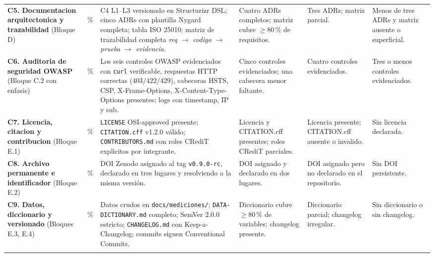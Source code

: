 \documentclass[11pt,a4paper]{article}
\begin{document}
{\begin{longtable}{|L{3.0cm}|C{0.9cm}|L{2.5cm}|L{2.5cm}|L{2.5cm}|L{2.3cm}|}
\textbf{C5. Documentacion arquitectonica y trazabilidad} (Bloque D) &
\,\% &
C4 L1--L3 versionado en Structurizr DSL; cinco ADRs con plantilla Nygard completa; tabla ISO 25010; matriz de trazabilidad completa \emph{req $\rightarrow$ codigo $\rightarrow$ prueba $\rightarrow$ evidencia}. &
Cuatro ADRs completos; matriz cubre $\geq 80$\,\% de requisitos. &
Tres ADRs; matriz parcial. &
Menos de tres ADRs y matriz ausente o superficial. \\

\textbf{C6. Auditoria de seguridad OWASP} (Bloque C.2 con enfasis) &
\,\% &
Los seis controles OWASP evidenciados con \texttt{curl} verificable, respuestas HTTP correctas (403/422/429), cabeceras HSTS, CSP, X-Frame-Options, X-Content-Type-Options presentes; logs con timestamp, IP y sub. &
Cinco controles evidenciados; una cabecera menor faltante. &
Cuatro controles evidenciados. &
Tres o menos controles evidenciados. \\

\textbf{C7. Licencia, citacion y contribucion} (Bloque E.1) &
\,\% &
\texttt{LICENSE} OSI-approved presente; \texttt{CITATION.cff} v1.2.0 v\'{a}lido; \texttt{CONTRIBUTORS.md} con roles CRediT explicitos por integrante. &
Licencia y CITATION.cff presentes; roles CRediT parciales. &
Licencia presente; CITATION.cff ausente o invalido. &
Sin licencia declarada. \\

\textbf{C8. Archivo permanente e identificador} (Bloque E.2) &
\,\% &
DOI Zenodo asignado al tag \texttt{v0.9.0-rc}, declarado en tres lugares y resolviendo a la misma versi\'{o}n. &
DOI asignado y declarado en dos lugares. &
DOI asignado pero no declarado en el repositorio. &
Sin DOI persistente. \\

\textbf{C9. Datos, diccionario y versionado} (Bloques E.3, E.4) &
\,\% &
Datos crudos en \texttt{docs/mediciones/}; \texttt{DATA-DICTIONARY.md} completo; SemVer 2.0.0 estricto; \texttt{CHANGELOG.md} con Keep-a-Changelog; commits siguen Conventional Commits. &
Diccionario cubre $\geq 80$\,\% de variables; changelog presente. &
Diccionario parcial; changelog irregular. &
Sin diccionario o sin changelog. \\


\end{longtable}}
\end{document}
